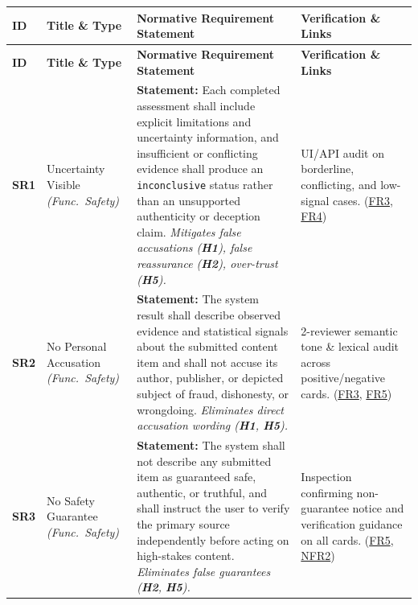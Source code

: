 \documentclass[11pt]{article}
\begin{document}
{\small
\setlength{\tabcolsep}{4pt}
\renewcommand{\arraystretch}{1.08}
\begin{tabularx}{\textwidth}{P{1.1cm} P{2.35cm} Y P{3.5cm}}
\caption{Safety and Security Requirements (\hyperref[SR1]{SR1}--\hyperref[SR9]{SR9})} \label{TblSafetyReqs}\\
\toprule
\textbf{ID} & \textbf{Title \& Type} & \textbf{Normative Requirement Statement} & \textbf{Verification \& Links}\\
\midrule
\endfirsthead
\toprule
\textbf{ID} & \textbf{Title \& Type} & \textbf{Normative Requirement Statement} & \textbf{Verification \& Links}\\
\midrule
\endhead
\bottomrule
\endfoot

\label{SR1}\textbf{SR1} & Uncertainty Visible \textit{(Func.\ Safety)} &
\textbf{Statement:} Each completed assessment shall include explicit limitations and uncertainty information, and insufficient or conflicting evidence shall produce an \texttt{inconclusive} status rather than an unsupported authenticity or deception claim.\newline
\textit{Mitigates false accusations (\textbf{H1}), false reassurance (\textbf{H2}), over-trust (\textbf{H5}).} &
UI/API audit on borderline, conflicting, and low-signal cases. (\hyperref[FR3]{FR3}, \hyperref[FR4]{FR4})\\
\midrule

\label{SR2}\textbf{SR2} & No Personal Accusation \textit{(Func.\ Safety)} &
\textbf{Statement:} The system result shall describe observed evidence and statistical signals about the submitted content item and shall not accuse its author, publisher, or depicted subject of fraud, dishonesty, or wrongdoing.\newline
\textit{Eliminates direct accusation wording (\textbf{H1}, \textbf{H5}).} &
2-reviewer semantic tone \& lexical audit across positive/negative cards. (\hyperref[FR3]{FR3}, \hyperref[FR5]{FR5})\\
\midrule

\label{SR3}\textbf{SR3} & No Safety Guarantee \textit{(Func.\ Safety)} &
\textbf{Statement:} The system shall not describe any submitted item as guaranteed safe, authentic, or truthful, and shall instruct the user to verify the primary source independently before acting on high-stakes content.\newline
\textit{Eliminates false guarantees (\textbf{H2}, \textbf{H5}).} &
Inspection confirming non-guarantee notice and verification guidance on all cards. (\hyperref[FR5]{FR5}, \hyperref[NFR2]{NFR2})\\
\midrule


\end{tabularx}}
\end{document}
